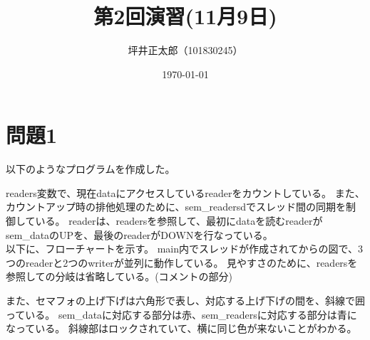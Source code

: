 \documentclass[a4paper,10pt]{jsarticle}
\begin{document}
\title{第2回演習(11月9日)}
\author{坪井正太郎（101830245）}
\date{\today}
\maketitle
\section{問題1}
以下のようなプログラムを作成した。

readers変数で、現在dataにアクセスしているreaderをカウントしている。
また、カウントアップ時の排他処理のために、sem\_readersdでスレッド間の同期を制御している。
readerは、readersを参照して、最初にdataを読むreaderがsem\_dataのUPを、最後のreaderがDOWNを行なっている。\\

以下に、フローチャートを示す。
main内でスレッドが作成されてからの図で、3つのreaderと2つのwriterが並列に動作している。
見やすさのために、readersを参照しての分岐は省略している。(コメントの部分)

また、セマフォの上げ下げは六角形で表し、対応する上げ下げの間を、斜線で囲っている。
sem\_dataに対応する部分は赤、sem\_readersに対応する部分は青になっている。
斜線部はロックされていて、横に同じ色が来ないことがわかる。
\end{document}
